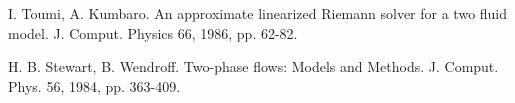 \documentclass[a4paper,12pt]{article}
\begin{document}
\begin{thebibliography}{< >}
 I. Toumi, A. Kumbaro. An approximate linearized  Riemann solver for a two fluid model. J. Comput. Physics 66, 1986, pp. 62-82.



 H. B. Stewart, B. Wendroff. Two-phase flows: Models and Methods. J. Comput. Phys. 56, 1984, pp. 363-409.




























 \end{thebibliography}
\end{document}
